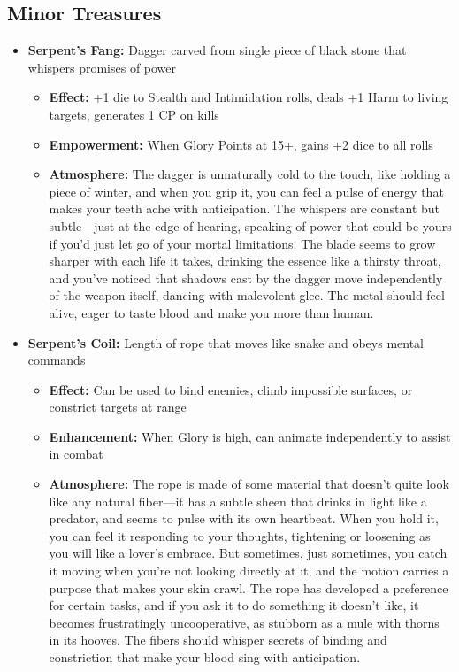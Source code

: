 \documentclass[11pt]{article}
\begin{document}
\subsection{Minor Treasures}
\begin{itemize}
\item \textbf{Serpent's Fang:} Dagger carved from single piece of black stone that whispers promises of power
  \begin{itemize}
  \item \textbf{Effect:} +1 die to Stealth and Intimidation rolls, deals +1 Harm to living targets, generates 1 CP on kills
  \item \textbf{Empowerment:} When Glory Points at 15+, gains +2 dice to all rolls
  \item \textbf{Atmosphere:} The dagger is unnaturally cold to the touch, like holding a piece of winter, and when you grip it, you can feel a pulse of energy that makes your teeth ache with anticipation. The whispers are constant but subtle—just at the edge of hearing, speaking of power that could be yours if you'd just let go of your mortal limitations. The blade seems to grow sharper with each life it takes, drinking the essence like a thirsty throat, and you've noticed that shadows cast by the dagger move independently of the weapon itself, dancing with malevolent glee. The metal should feel alive, eager to taste blood and make you more than human.
  \end{itemize}
\item \textbf{Serpent's Coil:} Length of rope that moves like snake and obeys mental commands
  \begin{itemize}
  \item \textbf{Effect:} Can be used to bind enemies, climb impossible surfaces, or constrict targets at range
  \item \textbf{Enhancement:} When Glory is high, can animate independently to assist in combat
  \item \textbf{Atmosphere:} The rope is made of some material that doesn't quite look like any natural fiber—it has a subtle sheen that drinks in light like a predator, and seems to pulse with its own heartbeat. When you hold it, you can feel it responding to your thoughts, tightening or loosening as you will like a lover's embrace. But sometimes, just sometimes, you catch it moving when you're not looking directly at it, and the motion carries a purpose that makes your skin crawl. The rope has developed a preference for certain tasks, and if you ask it to do something it doesn't like, it becomes frustratingly uncooperative, as stubborn as a mule with thorns in its hooves. The fibers should whisper secrets of binding and constriction that make your blood sing with anticipation.
  \end{itemize}
\end{itemize}
\end{document}
